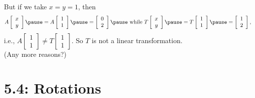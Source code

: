 \documentclass[pdf
]{beamer}
\begin{document}
{{\begin{example}
			But if we take $x=y=1$, 
			\pause then 
			\[ A\left[\begin{array}{c} x \\ y \end{array}\right]
			\pause
			=A\left[\begin{array}{c} 1 \\ 1 \end{array}\right]
			\pause
			=\left[\begin{array}{c} 0 \\ 2 \end{array}\right]
			\pause
			\mbox{ while }
			T\left[\begin{array}{c} x \\ y \end{array}\right]
			\pause
			=T\left[\begin{array}{c} 1 \\ 1 \end{array}\right]
			\pause
			=\left[\begin{array}{c} 1 \\ 2 \end{array}\right], \]
			\pause
			i.e., $A\left[\begin{array}{c} 1 \\ 1 \end{array}\right]
			\neq T\left[\begin{array}{c} 1 \\ 1 \end{array}\right]$.
			\pause
			So $T$ is \alert{not} a linear transformation.\\ \hfill (Any more reasons?)
		\end{example}
	}
}
\section{5.4: Rotations}

%	
\end{document}

